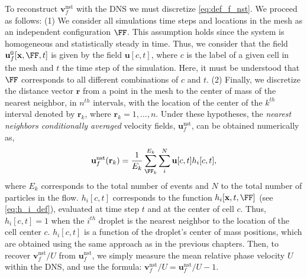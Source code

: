 To reconstruct $\textbf{v}_f^\text{nst}$ with the DNS we must discretize \ref{eq:def_f_nst}. 
We proceed as follows: 
(1) We consider all simulations time steps and locations in the mesh as an independent configuration $\FF$.
This assumption holds since the system is homogeneous and statistically steady in time.  
Thus, we consider that the field $\textbf{u}_f^0[\textbf{x},\FF,t]$ is given by the field $\textbf{u}[c,t]$, where $c$ is the label of a given cell in the mesh and $t$ the time step of the simulation. 
Here, it must be understood that $\FF$ corresponds to all different combinations of $c$ and $t$. 
(2) Finally, we discretize the distance vector $\textbf{r}$ from a point in the mesh to the center of mass of the nearest neighbor, in $n^{th}$ intervals, with the location of the center of the $k^{th}$ interval denoted by $\textbf{r}_k$, where $\textbf{r}_k = 1,\ldots,n$. 
Under these hypotheses, the \textit{nearest neighbors conditionally averaged} velocity fields, $\textbf{u}_f^\text{nst}$, can be obtained numerically as, 
\begin{equation}
    \textbf{u}_f^\text{nst}(\textbf{r}_k)
    = 
    \frac{1}{E_k}
    \sum_{\FF_k}^{E_k}
    \sum_i^N
    \textbf{u}[c,t] h_i[c,t],
    \label{eq:vnst_DNS}
\end{equation}
where $E_k$ corresponds to the total number of events and $N$ to the total number of particles in the flow.
$h_i[c,t]$ corresponds to the function $h_i[\textbf{x},t,\FF]$  (see \ref{eq:h_i_def}), evaluated at time step $t$ and at the center of cell $c$. 
Thus, $h_i[c,t] = 1$ when the $i^{th}$ droplet is the nearest neighbor to the location of the cell center $c$. 
$h_i[c,t]$ is a function of the droplet's center of mass positions, which are obtained using the same approach as in the previous chapters.
Then, to recover $\textbf{v}_f^\text{nst}/U$ from $\textbf{u}_f^\text{nst}$, we simply measure the mean relative phase velocity $U$ within the DNS, and use the formula: $\textbf{v}_f^\text{nst} /  U = \textbf{u}_f^\text{nst} / U -1 $. 



